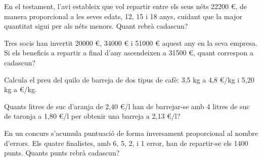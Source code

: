 \begin{mylist}


\exer
  En el testament, l'avi estableix que vol repartir entre els seus néts
  22200 \euro{}, de manera proporcional a les seves edats, 12, 15 i 18
  anys, cuidant que la major quantitat sigui per als néts menors. Quant
  rebrà cadascun?
  
  	
\exer
  Tres socis han invertit 20000 \euro{}, 34000 \euro{} i 51000 \euro{}
  aquest any en la seva empresa. Si els beneficis a repartir a final
  d'any ascendeixen a 31500 \euro{}, quant correspon a cadascun?


\exer
  Calcula el preu del quilo de barreja de dos tipus de cafè: 3,5 kg a
  4,8 \euro{}/kg i 5,20 kg a  \euro{}/kg.

	
\exer
  Quants litres de suc d'aranja de 2,40 \euro{}/l han de barrejar-se amb
  4 litres de suc de taronja a 1,80 \euro{}/l per obtenir una barreja a
  2,13 \euro{}/l?
  
  	
  \exer
  En un concurs s'acumula puntuació de forma inversament proporcional al
  nombre d'errors. Els quatre finalistes, amb 6, 5, 2, i 1 error, han de
  repartir-se els 1400 punts. Quants punts rebrà cadascun?
  
  

\end{mylist}

